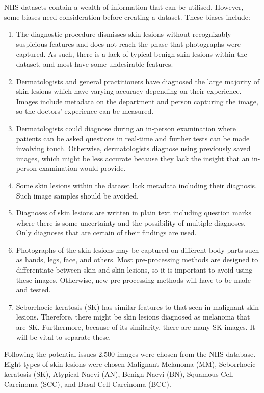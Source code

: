 NHS datasets contain a wealth of information that can be utilised. However, some biases need consideration before creating a dataset. These biases include:

\begin{enumerate}
	\item The diagnostic procedure dismisses skin lesions without recognizably suspicious features and does not reach the phase that photographs were captured. As such, there is a lack of typical benign skin lesions within the dataset, and most have some undesirable features.
	\item Dermatologists and general practitioners have diagnosed the large majority of skin lesions which have varying accuracy depending on their experience. Images include metadata on the department and person capturing the image, so the doctors' experience can be measured.
	\item Dermatologists could diagnose during an in-person examination where patients can be asked questions in real-time and further tests can be made involving touch. Otherwise, dermatologists diagnose using previously saved images, which might be less accurate because they lack the insight that an in-person examination would provide.
	\item Some skin lesions within the dataset lack metadata including their diagnosis. Such image samples should be avoided.
	\item Diagnoses of skin lesions are written in plain text including question marks where there is some uncertainty and the possibility of multiple diagnoses. Only diagnoses that are certain of their findings are used.
	\item Photographs of the skin lesions may be captured on different body parts such as hands, legs, face, and others. Most pre-processing methods are designed to differentiate between skin and skin lesions, so it is important to avoid using these images. Otherwise, new pre-processing methods will have to be made and tested.
	\item Seborrhoeic keratosis (SK) has similar features to that seen in malignant skin lesions. Therefore, there might be skin lesions diagnosed as melanoma that are SK. Furthermore, because of its similarity, there are many SK images. It will be vital to separate these.
\end{enumerate}

Following the potential issues 2,500 images were chosen from the NHS database. Eight types of skin lesions were chosen Malignant Melanoma (MM), Seborrhoeic keratosis (SK), Atypical Naevi (AN), Benign Naevi (BN), Squamous Cell Carcinoma (SCC), and Basal Cell Carcinoma (BCC).

